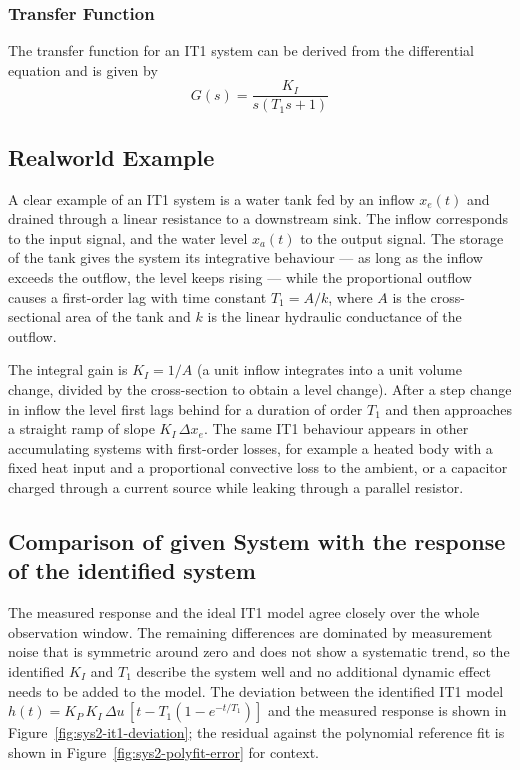 \documentclass[12pt, oneside, a4paper]{scrreprt}
\begin{document}
                \subsubsection{Transfer Function}
                    The transfer function for an IT1 system can be derived from the differential equation and is given by
                    \begin{equation}
                        G(s) = \frac{K_I}{s (T_1 s + 1)}
                    \end{equation}

            \subsection{Realworld Example}

                A clear example of an IT1 system is a water tank fed by an inflow $x_e(t)$ and drained through a linear resistance to a downstream sink. The inflow corresponds to the input signal, and the water level $x_a(t)$ to the output signal. The storage of the tank gives the system its integrative behaviour --- as long as the inflow exceeds the outflow, the level keeps rising --- while the proportional outflow causes a first-order lag with time constant $T_1 = A/k$, where $A$ is the cross-sectional area of the tank and $k$ is the linear hydraulic conductance of the outflow.

                The integral gain is $K_I = 1/A$ (a unit inflow integrates into a unit volume change, divided by the cross-section to obtain a level change). After a step change in inflow the level first lags behind for a duration of order $T_1$ and then approaches a straight ramp of slope $K_I\,\Delta x_e$. The same IT1 behaviour appears in other accumulating systems with first-order losses, for example a heated body with a fixed heat input and a proportional convective loss to the ambient, or a capacitor charged through a current source while leaking through a parallel resistor.

            \subsection{Comparison of given System with the response of the identified system}

            The measured response and the ideal IT1 model agree closely over the whole observation window. The remaining differences are dominated by measurement noise that is symmetric around zero and does not show a systematic trend, so the identified $K_I$ and $T_1$ describe the system well and no additional dynamic effect needs to be added to the model. The deviation between the identified IT1 model $h(t) = K_P\,K_I\,\Delta u\,[t - T_1(1 - e^{-t/T_1})]$ and the measured response is shown in Figure~\ref{fig:sys2-it1-deviation}; the residual against the polynomial reference fit is shown in Figure~\ref{fig:sys2-polyfit-error} for context.
\end{document}
